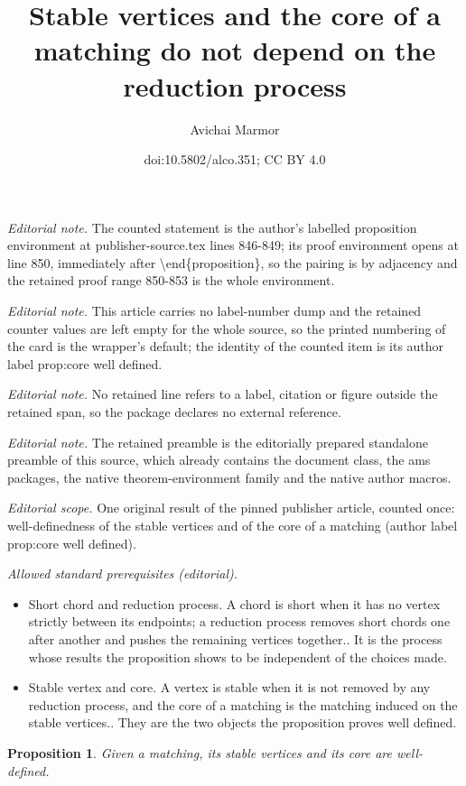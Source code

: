 \documentclass[11pt]{article}
\title{Stable vertices and the core of a matching do not depend on the reduction process}
\author{Avichai Marmor}
\date{doi:10.5802/alco.351; CC BY 4.0}
\newtheorem{proposition}[theo]{Proposition}
\theoremstyle{definition}
\numberwithin{equation}{section}
\begin{document}
\maketitle
\noindent\textit{Editorial note.} The counted statement is the author's labelled proposition environment at publisher-source.tex lines 846-849; its proof environment opens at line 850, immediately after \textbackslash{}end\{proposition\}, so the pairing is by adjacency and the retained proof range 850-853 is the whole environment.\par\medskip
\noindent\textit{Editorial note.} This article carries no label-number dump and the retained counter values are left empty for the whole source, so the printed numbering of the card is the wrapper's default; the identity of the counted item is its author label prop:core well defined.\par\medskip
\noindent\textit{Editorial note.} No retained line refers to a label, citation or figure outside the retained span, so the package declares no external reference.\par\medskip
\noindent\textit{Editorial note.} The retained preamble is the editorially prepared standalone preamble of this source, which already contains the document class, the ams packages, the native theorem-environment family and the native author macros.\par\medskip
\noindent\textit{Editorial scope.} One original result of the pinned publisher article, counted once: well-definedness of the stable vertices and of the core of a matching (author label prop:core well defined).\par\medskip
\noindent\textit{Allowed standard prerequisites (editorial).}\begin{itemize}
\item Short chord and reduction process. A chord is short when it has no vertex strictly between its endpoints; a reduction process removes short chords one after another and pushes the remaining vertices together.. It is the process whose results the proposition shows to be independent of the choices made.
\item Stable vertex and core. A vertex is stable when it is not removed by any reduction process, and the core of a matching is the matching induced on the stable vertices.. They are the two objects the proposition proves well defined.
\end{itemize}\medskip
\begin{proposition}
\label{prop:core well defined}
    Given a matching, its stable vertices and its core are well-defined.
\end{proposition}
\end{document}

